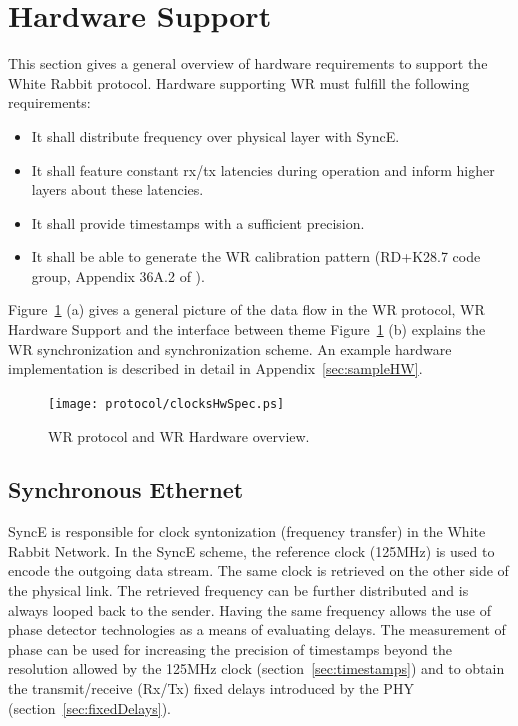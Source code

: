 \documentclass[a4paper, 12pt]{article}
\begin{document}
\newpage

\section{Hardware Support}
\label{sec:hw}


This section gives a general overview of hardware requirements to support the White Rabbit protocol. 
Hardware supporting WR must fulfill the following requirements:
\begin{itemize}
  \item It shall distribute frequency over physical layer with SyncE.
  \item It shall feature constant rx/tx latencies during operation and inform higher layers 
	about these latencies.
  \item It shall provide timestamps with a sufficient precision. 
  \item It shall be able to generate the WR calibration pattern 
	(RD+K28.7 code group, Appendix 36A.2 of \cite{IEEE802.3}).
\end{itemize}

Figure~\ref{fig:clocksHwSpec} (a) gives a general picture of the data flow in the WR 
protocol, WR Hardware Support and the interface between theme
Figure~\ref{fig:clocksHwSpec} (b) explains the WR synchronization and synchronization scheme.
An example hardware implementation is described in detail in Appendix~\ref{sec:sampleHW}.

\begin{figure}[ht!]
  \centering
  \texttt{[image: protocol/clocksHwSpec.ps]}
  \caption{WR protocol and WR Hardware overview.}
  \label{fig:clocksHwSpec}
\end{figure}


\subsection{Synchronous Ethernet}
\label{sec:syncE}
SyncE is responsible for clock syntonization (frequency transfer) in the White Rabbit Network. 
In the SyncE scheme, the reference clock (125MHz) is used to encode the outgoing data
stream. The same clock is retrieved on the other side of the physical link.
The retrieved frequency can be further distributed and is always looped back to the sender.
Having the same frequency allows the use of phase detector technologies as a means of evaluating
delays. The measurement of phase can be used for increasing the precision of timestamps 
beyond the resolution allowed by the 125MHz clock (section~\ref{sec:timestamps}) and to obtain 
the transmit/receive (Rx/Tx) fixed delays introduced by the PHY (section~\ref{sec:fixedDelays}).
\end{document}

